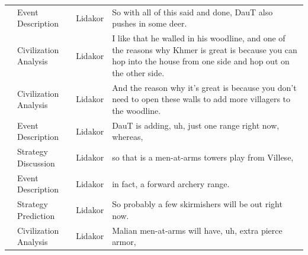 {\begin{longtable}{@{}>{\theAppRow}r|L{2.3cm}L{1.0cm}U{11.55cm}@{}}
    & Event Description     & Lidakor & So with all of this said and done, DauT also pushes in some deer.                                                                                                                                                                                                                               \\
    & Civilization Analysis & Lidakor & I like that he walled in his woodline, and one of the reasons why Khmer is great is because you can hop into the house from one side and hop out on the other side.                                                                                                                             \\
    & Civilization Analysis & Lidakor & And the reason why it's great is because you don't need to open these walls to add more villagers to the woodline.                                                                                                                                                                              \\
    & Event Description     & Lidakor & DauT is adding, uh, just one range right now, whereas,                                                                                                                                                                                                                                          \\
    & Strategy Discussion   & Lidakor & so that is a men-at-arms towers play from Villese,                                                                                                                                                                                                                                              \\
    & Event Description     & Lidakor & in fact, a forward archery range.                                                                                                                                                                                                                                                                \\
    & Strategy Prediction   & Lidakor & So probably a few skirmishers will be out right now.                                                                                                                                                                                                                                            \\
    & Civilization Analysis & Lidakor & Malian men-at-arms will have, uh, extra pierce armor,                                                                                                                                                                                                                                           \\

\end{longtable}}
